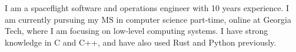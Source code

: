 \documentclass[letter,10pt]{article}
\begin{document}
I am a spaceflight software and operations engineer with 10 years experience. I am currently pursuing my MS in computer science part-time, online at Georgia Tech, where I am focusing on low-level computing systems. I have strong knowledge in C and C++, and have also used Rust and Python previously.
\end{document}
